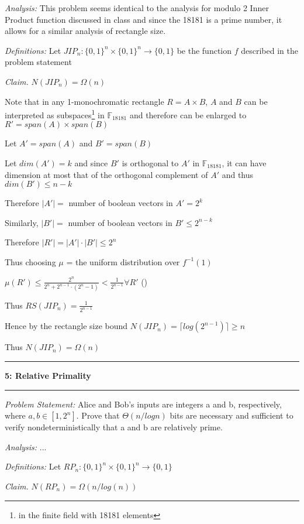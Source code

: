 \documentclass[11pt]{article}
\newcommand\question[2]{\vspace{.25in}\hrule\textbf{#1: #2}\vspace{.5em}\hrule\vspace{.10in}}
\newcommand\analysis{\vspace{.10in}\emph{Analysis: }\newline}
\newcommand\problem{\emph{Problem Statement:}\newline}
\newcommand\definitions{\emph{Definitions:}\newline}
\newcommand\claim{\emph{Claim.}\newline}
\begin{document}
\analysis
This problem seems identical to the analysis for modulo 2 Inner Product function discussed in class and since the 18181 is a prime number, it allows for a similar analysis of rectangle size. 

\definitions
Let $JIP_n: {\{0, 1\}}^n \times {\{0, 1\}}^n \to \{0, 1\}$ be the function $f$ described in the problem statement

\claim
$N(JIP_n) = \Omega(n)$ 

\proof 
Note that in any 1-monochromatic rectangle $R = A \times B$, $A$ and $B$ can be interpreted as subspaces\footnote{in the finite field with 18181 elements} in $\mathbb{F}_{18181}$ and therefore can be enlarged to $R' = span(A) \times span(B)$

Let $A' = span(A)$ and $B' = span(B)$

Let $dim(A') = k$ and since $B'$ is orthogonal to $A'$ in $\mathbb{F}_{18181}$, it can have dimension at most that of the orthogonal complement of $A'$ and thus $dim(B') \leq n - k$

Therefore $\lvert A' \rvert =$ number of boolean vectors in $A' = 2^k$

Similarly, $\lvert B' \rvert =$ number of boolean vectors in $B' \leq 2^{n-k}$

Therefore $\lvert R' \rvert = \lvert A' \rvert \cdot \lvert B' \rvert \leq 2^n$

Thus choosing $\mu$ = the uniform distribution over $f^{-1}(1)$ 

$\mu(R') \leq \frac{2^n}{2^n + 2^{n - 1} \cdot (2^n - 1)} < \frac{1}{2^{n-1}} \forall R'$ ()

Thus $RS(JIP_n) = \frac{1}{2^{n-1}}$

Hence by the rectangle size bound $N(JIP_n) = \lceil log(2^{n-1}) \rceil \geq n$

Thus  $N(JIP_n) = \Omega(n)$

\newpage

\question{5}{Relative Primality}

\problem
Alice and Bob’s inputs are integers a and b, respectively, where $a, b \in [1, 2^n]$. Prove that $\Theta(n/ log n)$ bits are necessary and sufficient to verify nondeterministically that a and b are relatively prime.

\analysis
... 

\definitions
Let $RP_n: {\{0, 1\}}^n \times {\{0, 1\}}^n \to \{0, 1\}$

\claim
$N(RP_n) = \Omega(n/log(n))$ 
\end{document}
